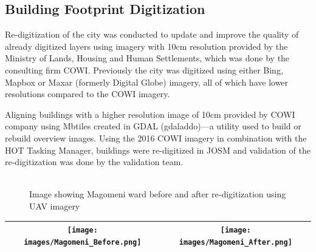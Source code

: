 \documentclass[a4paper,12pt,twoside]{article}
\begin{document}
\subsection{Building Footprint Digitization}
\begin{multicols}{2}
Re-digitization of the city was conducted to update and improve the quality of already digitized layers using imagery with 10cm resolution provided by the Ministry of Lands, Housing and Human Settlements, which was done by the consulting firm COWI. Previously the city was digitized using either Bing, Mapbox or Maxar (formerly Digital Globe) imagery, all of which have lower resolutions compared to the COWI imagery.

Aligning buildings with a higher resolution image of 10cm provided by COWI company using Mbtiles created in GDAL (gdaladdo)---a utility used to build or rebuild overview images. Using the 2016 COWI imagery in combination with the HOT Tasking Manager, buildings were re-digitized in JOSM and validation of the re-digitization was done by the validation team.
\end{multicols}

 \begin{figure}[h]
	\caption{Image showing Magomeni ward before and after re-digitization using UAV imagery}
	\centering
	\includegraphics[width=0\textwidth]{images/Building_Footprint_Digitization.png}
\end{figure}
\begin{tabular}{|c@{}c|}
	\hline
	
	\texttt{[image: images/Magomeni\_Before.png]}&%
	\texttt{[image: images/Magomeni\_After.png]}\\
	\hline
\end{tabular}
\end{document}
